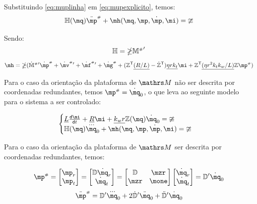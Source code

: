 \documentclass[a4paper,11pt,brazil,fleqn]{article}
\begin{document}
Substituindo \eqref{eq:muplinha} em \eqref{eq:mupexplicito}, temos:
\begin{equation} \label{eq:ModeloGenerico}
\mH(\mq) \ddot{\mp}\ssh + \mh(\mq,\mp,\dot{\mp}, \mi) = \mup
\end{equation}

Sendo:
\begin{equation}
\mathbb{H} = \mathbb{\Lambda} {\mathbb{M}^{\scriptscriptstyle \#}}'
\end{equation}
\begin{equation}
\mh = \mLambda ({{\dot{\mM}}\ssh}{'} \dot{\mp}\ssh + {\dot{\mv}\ssh}{'} + {\dot{\mf}\ssh}{'} + {\dot{\mg}\ssh} + ( \mZ^\msT  \underline{(R/L)} - \dot{\mZ}^\msT ) \underline{\eta r k_t} \mi + \mZ^\msT  \underline{(\eta r^2 k_t k_w / L)}  \mZ \mp\ssh)
\end{equation}

Para o caso da orienta\c{c}\~ao da plataforma de $\ssM$ n\~ao ser descrita por coordenadas redundantes, temos $\mp\ssh = \dot{\mq}_0$, o que leva ao seguinte modelo para o sistema a ser controlado:

\begin{equation} \label{eq:ModeloSRed}
\begin{cases}
\underline{L} \frac{\dd \mi}{\dd t} + \underline{R} \mi + \underline{k_w r} \mZ (\mq) \dot{\mq}_0= \mup
\\
\mH(\mq) \dddot{\mq}_0 + \mh(\mq,\mp,\dot{\mp}, \mi) = \mup
\end{cases}
\end{equation}

Para o caso da orienta\c{c}\~ao da plataforma de $\ssM$ ser descrita por coordenadas redundantes, temos:

\begin{equation}
\mp\ssh = \begin{bmatrix}
\mp_r \\
\mp_t \\
\end{bmatrix}
=
\begin{bmatrix}
\mD \dot{\mq}_r \\
\dot{\mq}_t \\
\end{bmatrix}
=
\begin{bmatrix}
\mD & \mzr \\
\mzr & \mone
\end{bmatrix}
\begin{bmatrix}
\dot{\mq}_r \\
\dot{\mq}_t \\
\end{bmatrix}
= \mD' \dot{\mq}_0
\end{equation}
\begin{equation} \label{eq:mp2mq}
\ddot{\mp}\ssh = \mD' \dddot{\mq}_0 + 2\dot{\mD}' \ddot{\mq}_0 + \ddot{\mD}' \dot{\mq}_0
\end{equation}
\end{document}
